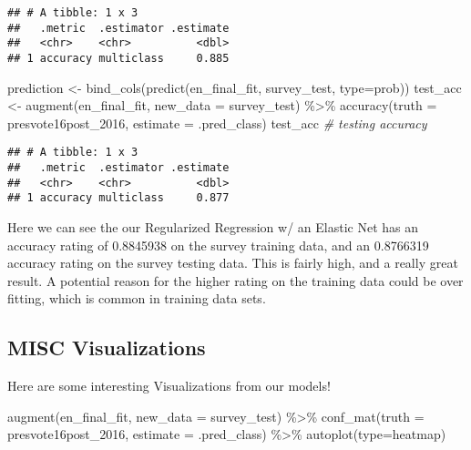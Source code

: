 \documentclass[
]{article}
\newenvironment{Shaded}{\begin{snugshade}}{\end{snugshade}}
\newcommand{\AttributeTok}[1]{\textcolor[rgb]{0.77,0.63,0.00}{#1}}
\newcommand{\CommentTok}[1]{\textcolor[rgb]{0.56,0.35,0.01}{\textit{#1}}}
\newcommand{\FunctionTok}[1]{\textcolor[rgb]{0.00,0.00,0.00}{#1}}
\newcommand{\NormalTok}[1]{#1}
\newcommand{\OtherTok}[1]{\textcolor[rgb]{0.56,0.35,0.01}{#1}}
\newcommand{\SpecialCharTok}[1]{\textcolor[rgb]{0.00,0.00,0.00}{#1}}
\newcommand{\StringTok}[1]{\textcolor[rgb]{0.31,0.60,0.02}{#1}}
\begin{document}
\begin{verbatim}
## # A tibble: 1 x 3
##   .metric  .estimator .estimate
##   <chr>    <chr>          <dbl>
## 1 accuracy multiclass     0.885
\end{verbatim}

\begin{Shaded}
\begin{Highlighting}[]
\NormalTok{prediction }\OtherTok{\textless{}{-}} \FunctionTok{bind\_cols}\NormalTok{(}\FunctionTok{predict}\NormalTok{(en\_final\_fit, survey\_test, }\AttributeTok{type=}\StringTok{\textquotesingle{}prob\textquotesingle{}}\NormalTok{))}
\NormalTok{test\_acc }\OtherTok{\textless{}{-}} \FunctionTok{augment}\NormalTok{(en\_final\_fit, }\AttributeTok{new\_data =}\NormalTok{ survey\_test) }\SpecialCharTok{\%\textgreater{}\%}
  \FunctionTok{accuracy}\NormalTok{(}\AttributeTok{truth =} \StringTok{\textquotesingle{}presvote16post\_2016\textquotesingle{}}\NormalTok{, }\AttributeTok{estimate =}\NormalTok{ .pred\_class)}
\NormalTok{test\_acc }\CommentTok{\# testing accuracy}
\end{Highlighting}
\end{Shaded}

\begin{verbatim}
## # A tibble: 1 x 3
##   .metric  .estimator .estimate
##   <chr>    <chr>          <dbl>
## 1 accuracy multiclass     0.877
\end{verbatim}

Here we can see the our Regularized Regression w/ an Elastic Net has an
accuracy rating of 0.8845938 on the survey training data, and an
0.8766319 accuracy rating on the survey testing data. This is fairly
high, and a really great result. A potential reason for the higher
rating on the training data could be over fitting, which is common in
training data sets.

\hypertarget{misc-visualizations}{%
\subsection{MISC Visualizations}\label{misc-visualizations}}

Here are some interesting Visualizations from our models!

\begin{Shaded}
\begin{Highlighting}[]
\FunctionTok{augment}\NormalTok{(en\_final\_fit, }\AttributeTok{new\_data =}\NormalTok{ survey\_test) }\SpecialCharTok{\%\textgreater{}\%}
  \FunctionTok{conf\_mat}\NormalTok{(}\AttributeTok{truth =}\NormalTok{ presvote16post\_2016, }\AttributeTok{estimate =}\NormalTok{ .pred\_class)  }\SpecialCharTok{\%\textgreater{}\%}
  \FunctionTok{autoplot}\NormalTok{(}\AttributeTok{type=}\StringTok{\textquotesingle{}heatmap\textquotesingle{}}\NormalTok{)}
\end{Highlighting}
\end{Shaded}
\end{document}
